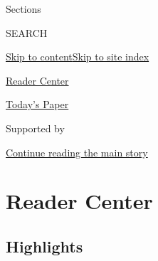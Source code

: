 Sections

SEARCH

\protect\hyperlink{site-content}{Skip to
content}\protect\hyperlink{site-index}{Skip to site index}

\href{https://www.nytimes3xbfgragh.onion/section/reader-center}{Reader
Center}

\href{https://myaccount.nytimes3xbfgragh.onion/auth/login?response_type=cookie\&client_id=vi}{}

\href{https://www.nytimes3xbfgragh.onion/section/todayspaper}{Today's
Paper}

Supported by

\protect\hyperlink{after-sponsor}{Continue reading the main story}

\hypertarget{reader-center}{%
\section{Reader Center}\label{reader-center}}

\hypertarget{highlights}{%
\subsection{Highlights}\label{highlights}}

